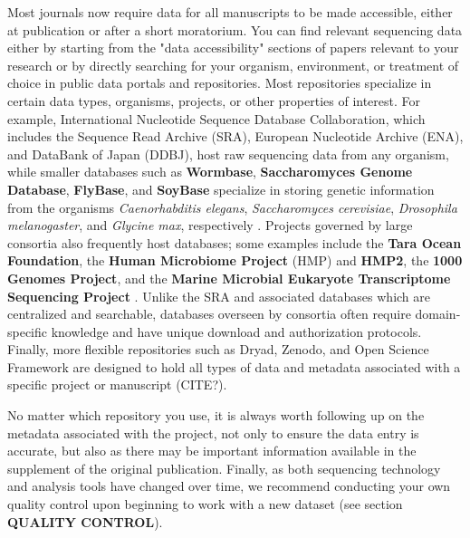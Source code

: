 \documentclass[10pt,letterpaper]{article}
\begin{document}
Most journals now require data for all manuscripts to be made accessible, either at publication or after a short moratorium. You can find relevant sequencing data either by starting from the "data accessibility" sections of papers relevant to your research or by directly searching for your organism, environment, or treatment of choice in public data portals and repositories. Most repositories specialize in certain data types, organisms, projects, or other properties of interest. For example, International Nucleotide Sequence Database Collaboration, which includes the Sequence Read Archive (SRA), European Nucleotide Archive (ENA), and DataBank of Japan (DDBJ), host raw sequencing data from any organism, while smaller databases such as \textbf{Wormbase}, \textbf{Saccharomyces Genome Database}, \textbf{FlyBase}, and \textbf{SoyBase} specialize in storing genetic information from the organisms \textit{Caenorhabditis elegans}, \textit{Saccharomyces cerevisiae}, \textit{Drosophila melanogaster}, and \textit{Glycine max}, respectively \cite{harris2020wormbase, cherry2012saccharomyces, st2014flybase, grant2010soybase}. Projects governed by large consortia also frequently host databases; some examples include the \textbf{Tara Ocean Foundation}, the \textbf{Human Microbiome Project} (HMP) and \textbf{HMP2}, the \textbf{1000 Genomes Project}, and the \textbf{Marine Microbial Eukaryote Transcriptome Sequencing Project} \cite{pesant2015open, turnbaugh2007human, integrative2014integrative, clarke20121000, keeling2014marine}. Unlike the SRA and associated databases which are centralized and searchable, databases overseen by consortia often require domain-specific knowledge and have unique download and authorization protocols. Finally, more flexible repositories such as Dryad, Zenodo, and Open Science Framework are designed to hold all types of data and metadata associated with a specific project or manuscript (CITE?).

No matter which repository you use, it is always worth following up on the metadata associated with the project, not only to ensure the data entry is accurate, but also as there may be important information available in the supplement of the original publication. Finally, as both sequencing technology and analysis tools have changed over time, we recommend conducting your own quality control upon beginning to work with a new dataset (see section \textbf{QUALITY CONTROL}).  %

\end{document}
